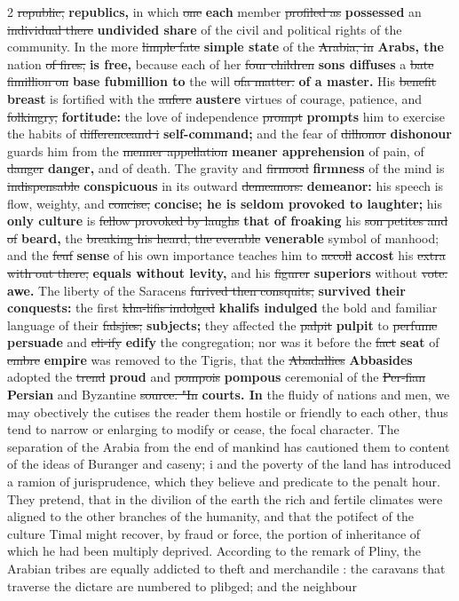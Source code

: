 \documentclass[10pt]{article}
\begin{document}
\begin{multicols}{2}
\sout{republic,} \textbf{republics,} in which \sout{one} \textbf{each} member \sout{profiled as} \textbf{possessed} an \sout{individual there} \textbf{undivided share} of the civil and political rights of the community. In the more \sout{limple fate} \textbf{simple state} of the \sout{Arabia, in} \textbf{Arabs, the} nation \sout{of fires,} \textbf{is free,} because each of her \sout{four children} \textbf{sons diffuses} a \sout{bate fimillion on} \textbf{base fubmillion to} the will \sout{ofa matter.} \textbf{of a master.} His \sout{benefit} \textbf{breast} is fortified with the \sout{aufere} \textbf{austere} virtues of courage, patience, and \sout{folkingry,} \textbf{fortitude:} the love of independence \sout{prompt} \textbf{prompts} him to exercise the habits of \sout{differenceand i} \textbf{self-command;} and the fear of \sout{dilhonor} \textbf{dishonour} guards him from the \sout{menner appellation} \textbf{meaner apprehension} of pain, of \sout{danger} \textbf{danger,} and of death. The gravity and \sout{firmood} \textbf{firmness} of the mind is \sout{indispensable} \textbf{conspicuous} in its outward \sout{demeanors:} \textbf{demeanor:} his speech is flow, weighty, and \sout{concise,} \textbf{concise; he is seldom provoked to laughter;} his \textbf{only culture} is \sout{fellow provoked by laughs} \textbf{that of froaking} his \sout{son petites and of} \textbf{beard,} the \sout{breaking his heard, the everable} \textbf{venerable} symbol of manhood; and the \sout{feuf} \textbf{sense} of his own importance teaches him to \sout{accoll} \textbf{accost} his \sout{extra with out there,} \textbf{equals without levity,} and his \sout{figurer} \textbf{superiors} without \sout{vote.} \textbf{awe.} The liberty of the Saracens \sout{furived then consquits,} \textbf{survived their conquests:} the first \sout{kha-lifis indolged} \textbf{khalifs indulged} the bold and familiar language of their \sout{falsjies;} \textbf{subjects;} they affected the \sout{palpit} \textbf{pulpit} to \sout{perfume} \textbf{persuade} and \sout{eli-ify} \textbf{edify} the congregation; nor was it before the \sout{fact} \textbf{seat} of \sout{embre} \textbf{empire} was removed to the Tigris, that the \sout{Abadallies} \textbf{Abbasides} adopted the \sout{trend} \textbf{proud} and \sout{pompois} \textbf{pompous} ceremonial of the \sout{Per-fian} \textbf{Persian} and Byzantine \sout{source. "In} \textbf{courts. In} the fluidy of nations and men, we may obectively the cutises the reader them hostile or friendly to each other, thus tend to narrow or enlarging to modify or cease, the focal character. The separation of the Arabia from the end of mankind has cautioned them to content of the ideas of Buranger and caseny; i and the poverty of the land has introduced a ramion of jurisprudence, which they believe and predicate to the penalt hour. They pretend, that in the divilion of the earth the rich and fertile climates were aligned to the other branches of the humanity, and that the potifect of the culture Timal might recover, by fraud or force, the portion of inheritance of which he had been multiply deprived. According to the remark of Pliny, the Arabian tribes are equally addicted to theft and merchandile : the caravans that traverse the dictare are numbered to plibged; and the neighbour 
\end{multicols}
\end{document}

